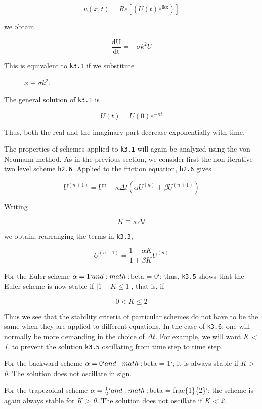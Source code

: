 \[u\left( x,t \right) = Re\left\lbrack \left( U\left( t \right)e^{\text{ikx}} \right) \right\rbrack\]

we obtain

\[\frac{\text{dU}}{\text{dt}} = - \sigma k^{2}U\]

\begin{description}
    \item[This is equivalent to \texttt{k3.1} if we substitute]
    \(x \equiv \sigma k^{2}\).
\end{description}

The general solution of \texttt{k3.1} is

\[U\left( t \right) = U\left( 0 \right)e^{- \kappa t}\]

Thus, both the real and the imaginary part decrease exponentially with
time.

The properties of schemes applied to \texttt{k3.1} will again be
analyzed using the von Neumann method. As in the previous section, we
consider first the non-iterative two level scheme \texttt{h2.6}. Applied
to the friction equation, \texttt{h2.6} gives

\[U^{(n + 1)} = U^{n} - \kappa\Delta t \left( \alpha U^{( n )} + \beta U^{\left( n + 1 \right)} \right)\]

Writing

\[K \equiv \kappa \Delta t\]

we obtain, rearranging the terms in \texttt{k3.3},

\[U^{\left( n + 1 \right)} = \frac{1 - \alpha K}{1 + \beta K}U^{\left( n \right)}\]

For the Euler scheme \(\alpha = 1`and :math:\)beta = 0`; thus,
\texttt{k3.5} shows that the Euler scheme is now stable if
\(\left| 1 - K \leq 1 \right|\), that is, if

\[0 < K \leq 2\]

Thus we see that the stability criteria of particular schemes do not
have to be the same when they are applied to different equations. In the
case of \texttt{k3.6}, one will normally be more demanding in the choice
of \(\Delta t\). For example, we will want \emph{K \textless{} 1}, to
prevent the solution \texttt{k3.5} oscillating from time step to time
step.

For the backward scheme \(\alpha = 0`and :math:\)beta = 1`; it is always
stable if \emph{K \textgreater{} 0}. The solution does not oscillate in
sign.

For the trapezoidal scheme \(\alpha = \frac{1}{2}`and
:math:\)beta = frac\{1\}\{2\}`; the scheme is again always stable for
\emph{K \textgreater{} 0}. The solution does not oscillate if \emph{K
\textless{} 2}.

